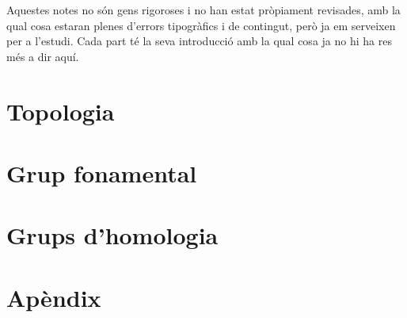 \documentclass[titlepage, main=catalan, 11pt]{book}
\theoremstyle{definition}
\theoremstyle{plain}
\theoremstyle{remark}
\begin{document}
Aquestes notes no són gens rigoroses i no han estat pròpiament revisades, amb la qual cosa estaran plenes d'errors tipogràfics i de contingut, però ja em serveixen per a l'estudi. Cada part té la seva introducció amb la qual cosa ja no hi ha res més a dir aquí.









\part{Topologia}

\part{Grup fonamental}

\part{Grups d'homologia}



\part{Apèndix}
\appendix






\printindex
\printbibliography
\end{document}
